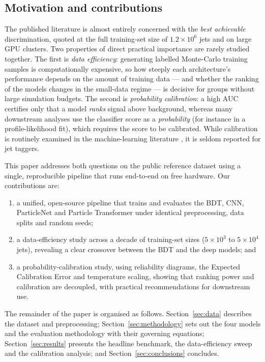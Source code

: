 \documentclass[preprint,12pt]{elsarticle}
\begin{document}
\subsection{Motivation and contributions}
The published literature is almost entirely concerned with the \emph{best
achievable} discrimination, quoted at the full training-set size of
$1.2\times10^{6}$ jets and on large GPU clusters. Two properties of direct
practical importance are rarely studied together. The first is \emph{data
efficiency}: generating labelled Monte-Carlo training samples is
computationally expensive, so how steeply each architecture's performance
depends on the amount of training data --- and whether the ranking of the
models changes in the small-data regime --- is decisive for groups without
large simulation budgets. The second is \emph{probability calibration}: a high
AUC certifies only that a model \emph{ranks} signal above background, whereas
many downstream analyses use the classifier score as a \emph{probability}
(for instance in a profile-likelihood fit), which requires the score to be
calibrated. While calibration is routinely examined in the machine-learning
literature \citep{guo2017calibration,niculescu2005calibration}, it is seldom
reported for jet taggers.

This paper addresses both questions on the public reference dataset using a
single, reproducible pipeline that runs end-to-end on free hardware. Our
contributions are:
\begin{enumerate}
    \item a unified, open-source pipeline that trains and evaluates the BDT,
    CNN, ParticleNet and Particle Transformer under identical preprocessing,
    data splits and random seeds;
    \item a data-efficiency study across a decade of training-set sizes
    ($5\times10^{3}$ to $5\times10^{4}$ jets), revealing a clear crossover
    between the BDT and the deep models; and
    \item a probability-calibration study, using reliability diagrams, the
    Expected Calibration Error and temperature scaling, showing that ranking
    power and calibration are decoupled, with practical recommendations for
    downstream use.
\end{enumerate}
The remainder of the paper is organised as follows.
Section~\ref{sec:data} describes the dataset and preprocessing;
Section~\ref{sec:methodology} sets out the four models and the evaluation
methodology with their governing equations; Section~\ref{sec:results}
presents the headline benchmark, the data-efficiency sweep and the
calibration analysis; and Section~\ref{sec:conclusions} concludes.
\end{document}
